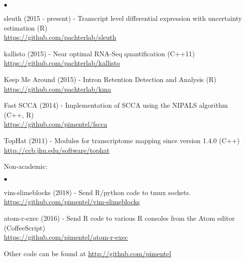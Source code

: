 \documentclass[overlapped]{res}
\newenvironment{list2}{
  \begin{list}{$\bullet$}{%
      \setlength{\itemsep}{0in}
      \setlength{\parsep}{0in} \setlength{\parskip}{0in}
      \setlength{\topsep}{0in} \setlength{\partopsep}{0in}
      \setlength{\leftmargin}{0.2in}}}{\end{list}}
\begin{document}
\begin{resume}
\begin{list2}
  \item sleuth (2015 - present) - Transcript level differential expression with uncertainty estimation (R)\\
    \url{https://github.com/pachterlab/sleuth}
  \item kallisto (2015) - Near optimal RNA-Seq quantification (C++11)\\
    \url{https://github.com/pachterlab/kallisto}
  \item Keep Me Around (2015) - Intron Retention Detection and Analysis (R) \\
    \url{https://github.com/pachterlab/kma}
  \item Fast SCCA (2014) - Implementation of SCCA using the NIPALS algorithm (C++, R) \\
    \url{https://github.com/pimentel/fscca}
  \item TopHat (2011) - Modules for transcriptome mapping since version 1.4.0 (C++) \\
    \url{http://ccb.jhu.edu/software/tophat}
\end{list2}

\vspace*{0.2cm}

Non-academic:

\begin{list2}
\item vim-slimeblocks (2018) - Send R/python code to tmux sockets.\\
  \url{https://github.com/pimentel/vim-slimeblocks}
\item atom-r-exec (2016) - Send R code to various R consoles from the Atom editor (CoffeeScript)\\
  \url{https://github.com/pimentel/atom-r-exec}
  \item Other code can be found at \url{http://github.com/pimentel}

\end{list2}


\end{resume}
\end{document}
